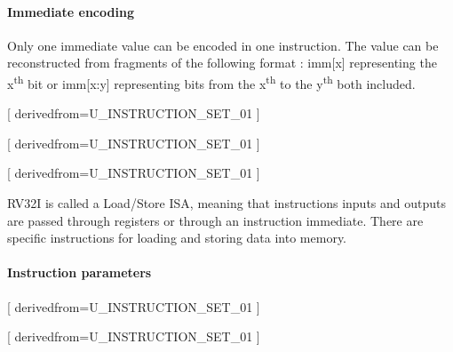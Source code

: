       \paragraph{Immediate encoding}

      \begin{content}
          Only one immediate value can be encoded in one instruction. The value can be reconstructed from fragments of the following format : imm[x] representing the x\textsuperscript{th} bit or imm[x:y] representing bits from the x\textsuperscript{th} to the y\textsuperscript{th} both included.
        \end{content}

      [
          derivedfrom=U\_INSTRUCTION\_SET\_01
        ]

      [
          derivedfrom=U\_INSTRUCTION\_SET\_01
        ]

      [
          derivedfrom=U\_INSTRUCTION\_SET\_01
        ]

      \begin{content}
          RV32I is called a Load/Store ISA, meaning that instructions inputs and outputs are passed through registers or through an instruction immediate. There are specific instructions for loading and storing data into memory.
        \end{content}

      \paragraph{Instruction parameters}

      [
          derivedfrom=U\_INSTRUCTION\_SET\_01
        ]

      [
          derivedfrom=U\_INSTRUCTION\_SET\_01
        ]

